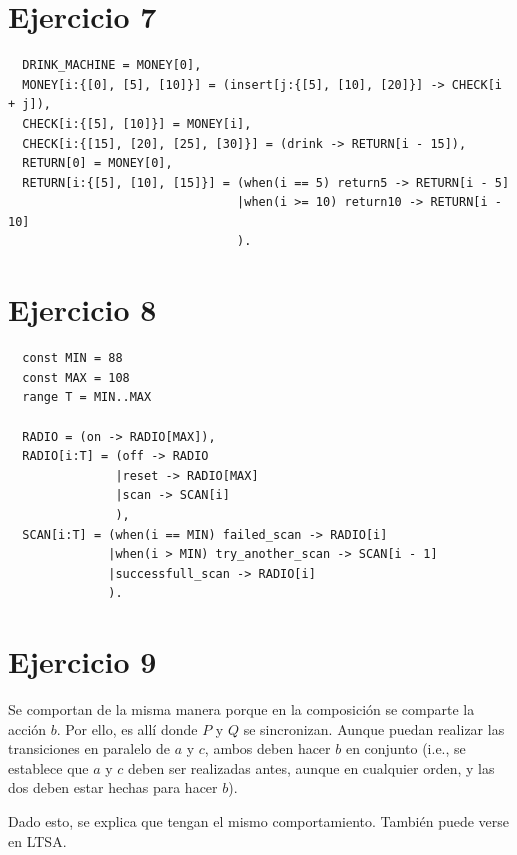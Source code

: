 \documentclass{article}
\begin{document}
\section*{Ejercicio 7}
\begin{verbatim}
  DRINK_MACHINE = MONEY[0],
  MONEY[i:{[0], [5], [10]}] = (insert[j:{[5], [10], [20]}] -> CHECK[i + j]),
  CHECK[i:{[5], [10]}] = MONEY[i],
  CHECK[i:{[15], [20], [25], [30]}] = (drink -> RETURN[i - 15]),
  RETURN[0] = MONEY[0],
  RETURN[i:{[5], [10], [15]}] = (when(i == 5) return5 -> RETURN[i - 5]
                                |when(i >= 10) return10 -> RETURN[i - 10]
                                ).
\end{verbatim}

\section*{Ejercicio 8}
\begin{verbatim}
  const MIN = 88
  const MAX = 108 
  range T = MIN..MAX 

  RADIO = (on -> RADIO[MAX]),
  RADIO[i:T] = (off -> RADIO 
               |reset -> RADIO[MAX]
               |scan -> SCAN[i]
               ),
  SCAN[i:T] = (when(i == MIN) failed_scan -> RADIO[i]
              |when(i > MIN) try_another_scan -> SCAN[i - 1]
              |successfull_scan -> RADIO[i]
              ).
\end{verbatim}

\section*{Ejercicio 9}
Se comportan de la misma manera porque en la composición se comparte la acción $b$.
Por ello, es allí donde $P$ y $Q$ se sincronizan.
Aunque puedan realizar las transiciones en paralelo de $a$ y $c$, ambos deben hacer $b$ en conjunto (i.e., se establece que $a$ y $c$ deben ser realizadas antes, aunque en cualquier orden, y las dos deben estar hechas para hacer $b$).

Dado esto, se explica que tengan el mismo comportamiento.
También puede verse en LTSA.
\end{document}
